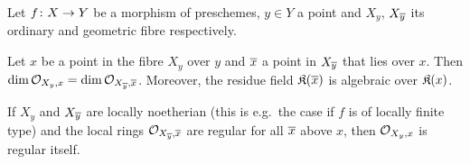 \documentclass[a4paper,parskip=half,numbers=enddot, DIV=12]{scrreprt}
\begin{document}
\begin{prop}
	Let $f\colon X\morphism Y$ be a morphism of preschemes, $y\in Y$ a point and $X_y$, $X_{\overline{y}}$ its ordinary and geometric fibre respectively.
	\begin{alphanumerate}
		\item Let $x$ be a point in the fibre $X_y$ over $y$ and $\overline{x}$ a point in $X_{\overline{y}}$ that lies over $x$. Then $\dim\mathcal{O}_{X_y,x}=\dim\mathcal{O}_{X_{\overline{y}},\overline{x}}$. Moreover, the residue field $\mathfrak{K}(\overline{x})$ is algebraic over $\mathfrak{K}(x)$.
		\item If $X_y$ and $X_{\overline{y}}$ are locally noetherian (this is e.g.\ the case if $f$ is of locally finite type) and the local rings $\mathcal{O}_{X_{\overline{y}},\overline{x}}$ are regular for all $\overline{x}$ above $x$, then $\mathcal{O}_{X_y,x}$ is regular itself.
	\end{alphanumerate}
\end{prop}
\end{document}
